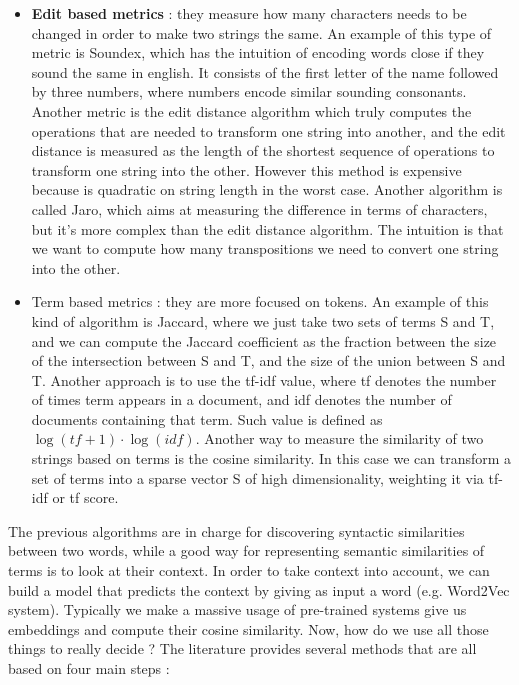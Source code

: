 \documentclass[11pt]{article}
\begin{document}
\begin{itemize}
\item \textbf{Edit based metrics} : they measure how many characters needs to be changed in order to make two strings the same. An example of this type of metric is Soundex, which has the intuition of encoding words close if they sound the same in english. It consists of the first letter of the name followed by three numbers, where numbers encode similar sounding consonants. Another metric is the edit distance algorithm which truly computes the operations that are needed to transform one string into another, and the edit distance is measured as the length of the shortest sequence of operations to transform one string into the other. However this method is expensive because is quadratic on string length in the worst case. Another algorithm is called Jaro, which aims at measuring the difference in terms of characters, but it's more complex than the edit distance algorithm. The intuition is that we want to compute how many transpositions we need to convert one string into the other.

\item{Term based metrics} : they are more focused on tokens. An example of this kind of algorithm is Jaccard, where we just take two sets of terms S and T, and we can compute the Jaccard coefficient as the fraction between the size of the intersection between S and T, and the size of the union between S and T. Another approach is to use the tf-idf value, where tf denotes the number of times term appears in a document, and idf denotes the number of documents containing that term. Such value is defined as $\log (tf + 1) \cdot \log (idf)$. Another way to measure the similarity of two strings based on terms is the cosine similarity. In this case we can transform a set of terms into a sparse vector S of high dimensionality, weighting it via tf-idf or tf score.
\end{itemize}

The previous algorithms are in charge for discovering syntactic similarities between two words, while a good way for representing semantic similarities of terms is to look at their context. In order to take context into account, we can build a model that predicts the context by giving as input a word (e.g. Word2Vec system). Typically we make a massive usage of pre-trained systems give us embeddings and compute their cosine similarity. Now, how do we use all those things to really decide ? The literature provides several methods that are all based on four main steps :
\end{document}

